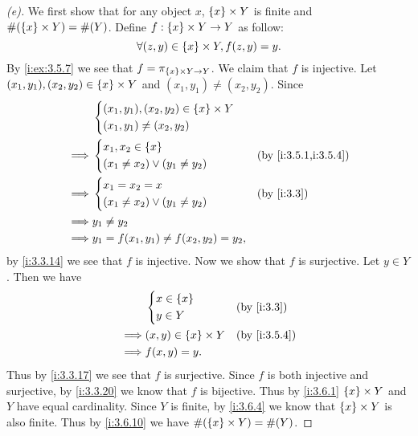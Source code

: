 \begin{proof}[(e)]
  We first show that for any object \(x\), \(\left\lbrace x\right\rbrace \times Y\) is finite and \(\#(\left\lbrace x\right\rbrace \times Y) = \#(Y)\).
  Define \(f : \left\lbrace x\right\rbrace \times Y \to Y\) as follow:
  \[
    \forall (z, y) \in \left\lbrace x\right\rbrace \times Y, f(z, y) = y.
  \]
  By \cref{i:ex:3.5.7} we see that \(f = \pi_{\left\lbrace x\right\rbrace \times Y \to Y}\).
  We claim that \(f\) is injective.
  Let \((x_1, y_1), (x_2, y_2) \in \left\lbrace x\right\rbrace \times Y\) and \((x_1, y_1) \neq (x_2, y_2)\).
  Since
  \begin{align*}
             & \begin{dcases}
                 (x_1, y_1), (x_2, y_2) \in \set{x} \times Y \\
                 (x_1, y_1) \neq (x_2, y_2)
               \end{dcases}        \\
    \implies & \begin{dcases}
                 x_1, x_2 \in \set{x} \\
                 (x_1 \neq x_2) \lor (y_1 \neq y_2)
               \end{dcases}             &  & \by{i:3.5.1,i:3.5.4} \\
    \implies & \begin{dcases}
                 x_1 = x_2 = x \\
                 (x_1 \neq x_2) \lor (y_1 \neq y_2)
               \end{dcases}             &  & \by{i:3.3}           \\
    \implies & y_1 \neq y_2                                       \\
    \implies & y_1 = f(x_1, y_1) \neq f(x_2, y_2) = y_2,
  \end{align*}
  by \cref{i:3.3.14} we see that \(f\) is injective.
  Now we show that \(f\) is surjective.
  Let \(y \in Y\).
  Then we have
  \begin{align*}
             & \begin{dcases}
                 x \in \set{x} \\
                 y \in Y
               \end{dcases}            &  & \by{i:3.3}       \\
    \implies & (x, y) \in \set{x} \times Y &  & \by{i:3.5.4} \\
    \implies & f(x, y) = y.
  \end{align*}
  Thus by \cref{i:3.3.17} we see that \(f\) is surjective.
  Since \(f\) is both injective and surjective, by \cref{i:3.3.20} we know that \(f\) is bijective.
  Thus by \cref{i:3.6.1} \(\left\lbrace x\right\rbrace \times Y\) and \(Y\) have equal cardinality.
  Since \(Y\) is finite, by \cref{i:3.6.4} we know that \(\left\lbrace x\right\rbrace \times Y\) is also finite.
  Thus by \cref{i:3.6.10} we have \(\#(\left\lbrace x\right\rbrace \times Y) = \#(Y)\).


\end{proof}
